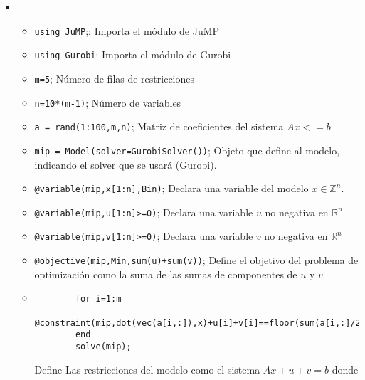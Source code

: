 \begin{itemize}
    \item \begin{itemize}
        \item \verb;using JuMP;;: Importa el módulo de JuMP
        \item \verb;using Gurobi;: Importa el módulo de Gurobi
        \item \verb;m=5;; Número de filas de restricciones
        \item \verb;n=10*(m-1);; Número de variables
        \item \verb;a = rand(1:100,m,n);; Matriz de coeficientes del sistema $Ax<=b$
        \item \verb;mip = Model(solver=GurobiSolver());; Objeto que define al modelo, indicando el solver que se usará (Gurobi).
        \item \verb;@variable(mip,x[1:n],Bin);; Declara una variable del modelo  $x\in\mathbb{Z}^n$.
        \item \verb;@variable(mip,u[1:n]>=0);; Declara una variable $u$ no negativa en $\mathbb{R}^n$
        \item \verb;@variable(mip,v[1:n]>=0);; Declara una variable $v$ no negativa en $\mathbb{R}^n$
        \item \verb;@objective(mip,Min,sum(u)+sum(v));; Define el objetivo del problema de optimizaci\'on como la suma de las sumas de componentes de $u$ y $v$
        \item
        \begin{verbatim}
        for i=1:m
          @constraint(mip,dot(vec(a[i,:]),x)+u[i]+v[i]==floor(sum(a[i,:]/2)));
        end
        solve(mip);
        \end{verbatim}



        Define Las restricciones del modelo como el sistema $Ax+u+v = b$ donde %

    \end{itemize}
\end{itemize}
